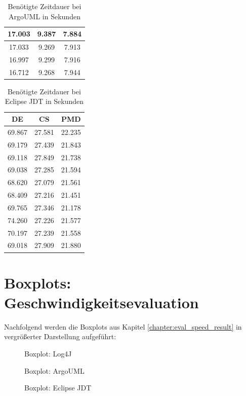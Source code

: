 \begin{appendices}
\begin{table}[]
\begin{tabular}{c|c|c}
17.003&	9.387&	7.884\\\hline
		
17.033&	9.269&	7.913\\\hline
		
16.997&	9.299&	7.916\\\hline
		
16.712&	9.268&	7.944\\\hline
    \end{tabular}
    \caption{Benötigte Zeitdauer bei ArgoUML in Sekunden}
    \label{tab:raw_argo}
\end{table}


\begin{table}[]
    \centering
    \begin{tabular}{c|c|c}
DE & CS &PMD\\\hline
69.867&27.581&22.235\\\hline
69.179&27.439&21.843\\\hline
69.118&27.849&21.738\\\hline
69.038&27.285&21.594\\\hline
68.620&27.079&21.561\\\hline
68.409&27.216&21.451\\\hline
69.765&27.346&21.178\\\hline
74.260&27.226&21.577\\\hline
70.197&27.239&21.558\\\hline
69.018&27.909&21.880\\\hline
    \end{tabular}
    \caption{Benötigte Zeitdauer bei Eclipse JDT in Sekunden}
    \label{tab:raw_eclipse}
\end{table}
\chapter{Boxplots: Geschwindigkeitsevaluation}\label{appendix:boxplots}
Nachfolgend werden die Boxplots aus Kapitel \ref{chapter:eval_speed_result} in vergrößerter Darstellung aufgeführt:
 \begin{figure}[ht!]

    \caption{Boxplot: Log4J}
  
\end{figure}
\hfill
 \begin{figure}
    \centering

    \caption{Boxplot: ArgoUML}
  
\end{figure}

 \begin{figure}
    \centering

    \caption{Boxplot: Eclipse \ac{JDT} }
  
\end{figure}
\end{appendices}
	
